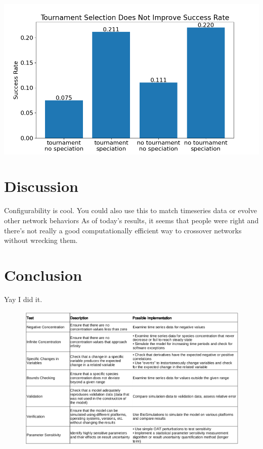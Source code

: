 \documentclass[12pt]{report}
\begin{document}
\begin{center}
    \includegraphics[width=15cm]{images/tournament_speciation.png}
    \label{fig:elitism_success}
\end{center}


\section{Discussion}
Configurability is cool. 
You could also use this to match timeseries data or evolve other network behaviors
As of today's results, it seems that people were right and there's not really a good computationally efficient way to crossover networks without wrecking them.

\section{Conclusion}
Yay I did it.

	


\begin{figure}
    \centering
    \includegraphics[width=19cm]{images/testSummary.png}
    \label{table:sensitivity}
\end{figure}





\end{document}
